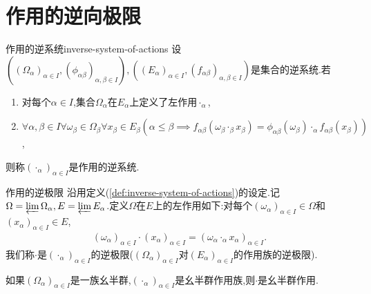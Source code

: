 \section{作用的逆向极限}

\begin{definition}{作用的逆系统}{inverse-system-of-actions}
	设$\left(\left(\Omega_{\alpha}\right)_{\alpha\in I},\left(\phi_{\alpha\beta}\right)_{\alpha,\beta\in I}\right),\left(\left(E_{\alpha}\right)_{\alpha\in I},\left(f_{\alpha\beta}\right)_{\alpha,\beta\in I}\right)$是集合的逆系统.若
	\begin{enumerate}
		\item 对每个$\alpha\in I$,集合$\Omega_{\alpha}$在$E_{\alpha}$上定义了左作用$\cdot_{\alpha}$,
		\item $\forall\alpha,\beta\in I\forall \omega_{\beta}\in\Omega_{\beta}\forall x_{\beta}\in E_{\beta}\left(\alpha\leq\beta\implies f_{\alpha\beta}\left(\omega_{\beta}\cdot_{\beta}x_{\beta}\right)=\phi_{\alpha\beta}\left(\omega_{\beta}\right)\cdot_{\alpha}f_{\alpha\beta}\left(x_{\beta}\right)\right)$,
	\end{enumerate}
	则称$\left(\cdot_{\alpha}\right)_{\alpha\in I}$是作用的逆系统.
\end{definition}

\begin{definition}{作用的逆极限}{}
	沿用定义(\ref{def:inverse-system-of-actions})的设定.记$\Omega=\varprojlim\Omega_{\alpha},E=\varprojlim E_{\alpha}$.定义$\Omega$在$E$上的左作用如下:对每个$\left(\omega_{\alpha}\right)_{\alpha\in I}\in\Omega$和$\left(x_{\alpha}\right)_{\alpha\in I}\in E$,
	\begin{align*}
		\left(\omega_{\alpha}\right)_{\alpha\in I}\cdot\left(x_{\alpha}\right)_{\alpha\in I}=\left(\omega_{\alpha}\cdot_{\alpha}x_{\alpha}\right)_{\alpha\in I}.
	\end{align*}
	我们称$\cdot$是$\left(\cdot_{\alpha}\right)_{\alpha\in I}$的逆极限($\left(\Omega_{\alpha}\right)_{\alpha\in I}$对$\left(E_{\alpha}\right)_{\alpha\in I}$的作用族的逆极限).
\end{definition}

\begin{remark}{}{}
	如果$\left(\Omega_{\alpha}\right)_{\alpha\in I}$是一族幺半群,$\left(\cdot_{\alpha}\right)_{\alpha\in I}$是幺半群作用族,则$\cdot$是幺半群作用.
\end{remark}

